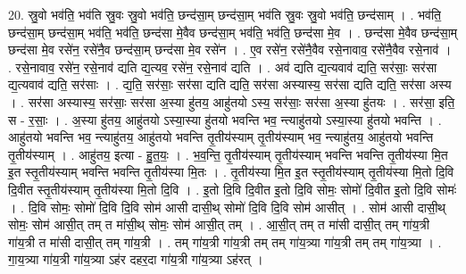 \documentclass[17pt]{extarticle}
\begin{document}
20. स्रु॒वो भव॑ति॒ भव॑ति स्रु॒वः स्रु॒वो भव॑ति॒ छन्द॑सा॒म् छन्द॑सा॒म् भव॑ति स्रु॒वः स्रु॒वो भव॑ति॒ छन्द॑साम् । . भव॑ति॒ छन्द॑सा॒म् छन्द॑सा॒म् भव॑ति॒ भव॑ति॒ छन्द॑सा मे॒वैव छन्द॑सा॒म् भव॑ति॒ भव॑ति॒ छन्द॑सा मे॒व । . छन्द॑सा मे॒वैव छन्द॑सा॒म् छन्द॑सा मे॒व रसे॑न॒ रसे॑नै॒व छन्द॑सा॒म् छन्द॑सा मे॒व रसे॑न । . ए॒व रसे॑न॒ रसे॑नै॒वैव रसे॒नावाव॒ रसे॑नै॒वैव रसे॒नाव॑ । . रसे॒नावाव॒ रसे॑न॒ रसे॒नाव॑ द्यति द्य॒त्यव॒ रसे॑न॒ रसे॒नाव॑ द्यति । . अव॑ द्यति द्य॒त्यवाव॑ द्यति॒ सर॑साः॒ सर॑सा द्य॒त्यवाव॑ द्यति॒ सर॑साः । . द्य॒ति॒ सर॑साः॒ सर॑सा द्यति द्यति॒ सर॑सा अस्यास्य॒ सर॑सा द्यति द्यति॒ सर॑सा अस्य । . सर॑सा अस्यास्य॒ सर॑साः॒ सर॑सा अ॒स्या हु॑तय॒ आहु॑तयो ऽस्य॒ सर॑साः॒ सर॑सा अ॒स्या हु॑तयः । . सर॑सा॒ इति॒ स - र॒साः॒ । . अ॒स्या हु॑तय॒ आहु॑तयो ऽस्या॒स्या हु॑तयो भवन्ति भव॒ न्त्याहु॑तयो ऽस्या॒स्या हु॑तयो भवन्ति । . आहु॑तयो भवन्ति भव॒ न्त्याहु॑तय॒ आहु॑तयो भवन्ति तृ॒तीय॑स्याम् तृ॒तीय॑स्याम् भव॒ न्त्याहु॑तय॒ आहु॑तयो भवन्ति तृ॒तीय॑स्याम् । . आहु॑तय॒ इत्या - हु॒त॒यः॒ । . भ॒व॒न्ति॒ तृ॒तीय॑स्याम् तृ॒तीय॑स्याम् भवन्ति भवन्ति तृ॒तीय॑स्या मि॒त इ॒त स्तृ॒तीय॑स्याम् भवन्ति भवन्ति तृ॒तीय॑स्या मि॒तः । . तृ॒तीय॑स्या मि॒त इ॒त स्तृ॒तीय॑स्याम् तृ॒तीय॑स्या मि॒तो दि॒वि दि॒वीत स्तृ॒तीय॑स्याम् तृ॒तीय॑स्या मि॒तो दि॒वि । . इ॒तो दि॒वि दि॒वीत इ॒तो दि॒वि सोमः॒ सोमो॑ दि॒वीत इ॒तो दि॒वि सोमः॑ । . दि॒वि सोमः॒ सोमो॑ दि॒वि दि॒वि सोम॑ आसी दासी॒थ् सोमो॑ दि॒वि दि॒वि सोम॑ आसीत् । . सोम॑ आसी दासी॒थ् सोमः॒ सोम॑ आसी॒त् तम् त मा॑सी॒थ् सोमः॒ सोम॑ आसी॒त् तम् । . आ॒सी॒त् तम् त मा॑सी दासी॒त् तम् गा॑य॒त्री गा॑य॒त्री त मा॑सी दासी॒त् तम् गा॑य॒त्री । . तम् गा॑य॒त्री गा॑य॒त्री तम् तम् गा॑य॒त्र्या गा॑य॒त्री तम् तम् गा॑य॒त्र्या । . गा॒य॒त्र्या गा॑य॒त्री गा॑य॒त्र्या ऽह॑र दहर॒दा गा॑य॒त्री गा॑य॒त्र्या ऽह॑रत् । \newline
\end{document}
